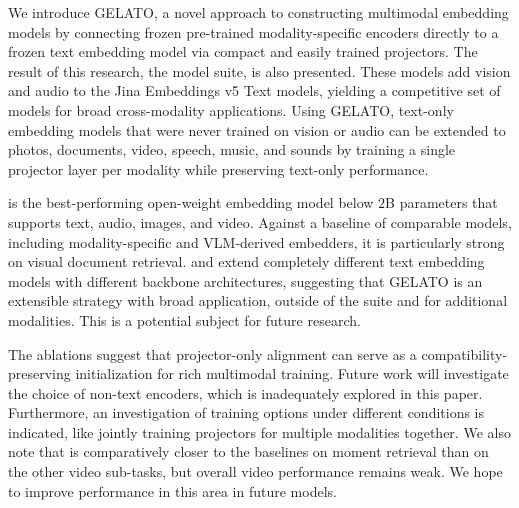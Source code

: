 


We introduce GELATO, a novel approach to constructing multimodal embedding models by connecting frozen pre-trained modality-specific encoders directly to a frozen text embedding model via compact and easily trained projectors.
The result of this research, the \omniBase{} model suite, is also presented. 
These models add vision and audio to the Jina Embeddings v5 Text models, yielding a competitive set of models for broad cross-modality applications. 
Using GELATO, text-only embedding models that were never trained on vision or audio can be extended to photos, documents, video, speech, music, and sounds by training a single projector layer per modality while preserving text-only performance.

\omniSmall{} is the best-performing open-weight embedding model below $2$B parameters that supports text, audio, images, and video.
Against a baseline of comparable models, including modality-specific and VLM-derived embedders, it is particularly strong on visual document retrieval.
\omniSmall{} and \omniNano{} extend completely different text embedding models with different backbone architectures, suggesting that GELATO is an extensible strategy with broad application, outside of the \omniBase{} suite and for additional modalities.
This is a potential subject for future research.

The ablations suggest that projector-only alignment can serve as a compatibility-preserving initialization for rich multimodal training.
Future work will investigate the choice of non-text encoders, which is inadequately explored in this paper.
Furthermore, an investigation of training options under different conditions is indicated, like jointly training projectors for multiple modalities together.
We also note that \omniBase{} is comparatively closer to the baselines on moment retrieval than on the other video sub-tasks, but overall video performance remains weak.
We hope to improve performance in this area in future models.
